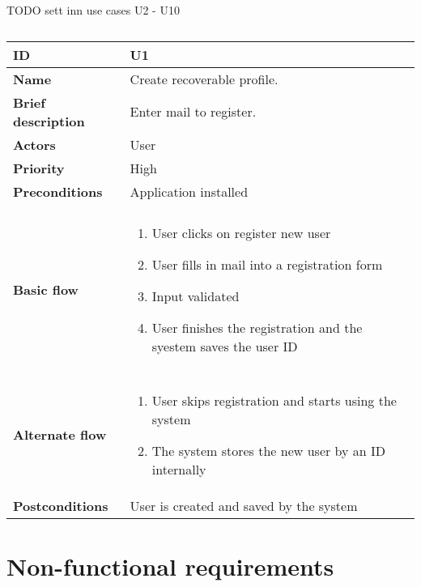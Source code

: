 TODO sett inn use cases U2 - U10\newline
\begin{table}[htp]
	\centering
	\caption{}
	\begin{tabular}[b]{|l | l|}\hline
		\textbf{ID} 				& U1									\\\hline
		\textbf{Name} 				& Create recoverable profile.			\\\hline
		\textbf{Brief description}	& Enter mail to register. 				\\\hline
		\textbf{Actors} 			& User									\\\hline
		\textbf{Priority}			& High									\\\hline
		\textbf{Preconditions}		& Application installed					\\\hline&\\[-2ex]
		\textbf{Basic flow}			& \begin{minipage}{5in}
									  \begin{enumerate}[noitemsep]
										\item User clicks on register new user
										\item User fills in mail into a registration form
										\item Input validated
										\item User finishes the registration and the syestem saves the user ID
									  \end{enumerate}						
									  \end{minipage}						\\\hline&\\[-2ex]
		\textbf{Alternate flow}		& \begin{minipage}{5in}
									  \begin{enumerate}[noitemsep]
										\item User skips registration and starts using the system
										\item The system stores the new user by an ID internally
									  \end{enumerate}
									 \end{minipage}							\\\hline
		\textbf{Postconditions}		& User is created and saved by the system\\\hline
	\end{tabular}
\end{table}

\section{Non-functional requirements}
\label{sec_non-functional_requirements}

